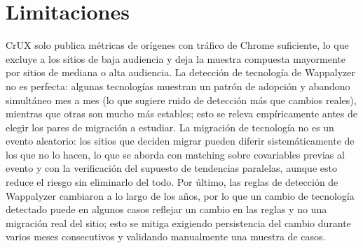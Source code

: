 \documentclass[12pt, a4paper]{article}
\begin{document}
\section{Limitaciones}

CrUX solo publica métricas de orígenes con tráfico de Chrome suficiente, lo que excluye a los sitios de baja audiencia y deja la muestra compuesta mayormente por sitios de mediana o alta audiencia. La detección de tecnología de Wappalyzer no es perfecta: algunas tecnologías muestran un patrón de adopción y abandono simultáneo mes a mes (lo que sugiere ruido de detección más que cambios reales), mientras que otras son mucho más estables; esto se releva empíricamente antes de elegir los pares de migración a estudiar. La migración de tecnología no es un evento aleatorio: los sitios que deciden migrar pueden diferir sistemáticamente de los que no lo hacen, lo que se aborda con matching sobre covariables previas al evento y con la verificación del supuesto de tendencias paralelas, aunque esto reduce el riesgo sin eliminarlo del todo. Por último, las reglas de detección de Wappalyzer cambiaron a lo largo de los años, por lo que un cambio de tecnología detectado puede en algunos casos reflejar un cambio en las reglas y no una migración real del sitio; esto se mitiga exigiendo persistencia del cambio durante varios meses consecutivos y validando manualmente una muestra de casos.



\end{document}
